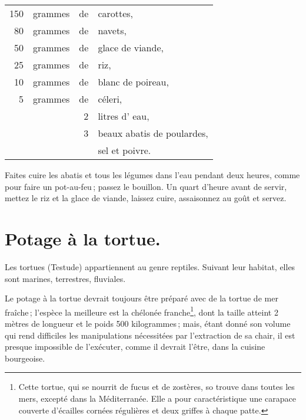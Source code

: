 \footnotesize
\begin{longtable}{rrrp{16em}}
   150 & grammes  & de & carottes,                                                                        \\
    80 & grammes  & de & navets,                                                                          \\
    50 & grammes  & de & glace de viande,                                                                 \\
    25 & grammes  & de & riz,                                                                             \\
    10 & grammes  & de & blanc de poireau,                                                                \\
     5 & grammes  & de & céleri,                                                                          \\
       &          &  2 & litres d' eau,                                                                   \\
       &          &  3 & beaux abatis de poulardes,                                                       \\
       &          &    & sel et poivre.                                                                   \\
\end{longtable}
\normalsize 

Faites cuire les abatis et tous les légumes dans l'eau pendant deux heures,
comme pour faire un pot-au-feu ; passez le bouillon. Un quart d'heure avant de
servir, mettez le riz et la glace de viande, laissez cuire, assaisonnez au goût
et servez.

\section*{\centering Potage à la tortue.}

Les tortues (Testude) appartiennent au genre reptiles. Suivant leur habitat,
elles sont marines, terrestres, fluviales.

Le potage à la tortue devrait toujours être préparé avec de la tortue de mer
fraîche ; l'espèce la meilleure est la chélonée franche\footnote{Cette tortue,
qui se nourrit de fucus et de zostères, so trouve dans toutes les mers, excepté
dans la Méditerranée. Elle a pour caractéristique une carapace couverte
d'écailles cornées régulières et deux griffes à chaque patte.}, dont la taille
atteint 2 mètres de longueur et le poids 500 kilogrammes ; mais, étant donné
son volume qui rend difficiles les manipulations nécessitées par l'extraction
de sa chair, il est presque impossible de l'exécuter, comme il devrait l'être,
dans la cuisine bourgeoise.

